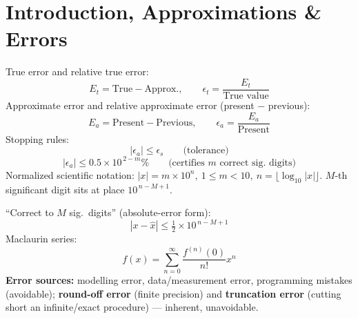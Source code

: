 \section{Introduction, Approximations \& Errors}

\begin{formulabox}
True error and relative true error:
\[
E_t = \text{True} - \text{Approx.}, \qquad \epsilon_t = \frac{E_t}{\text{True value}}
\]
Approximate error and relative approximate error (present $-$ previous):
\[
E_a = \text{Present} - \text{Previous}, \qquad \epsilon_a = \frac{E_a}{\text{Present}}
\]
Stopping rules:
\[
|\epsilon_a| \le \epsilon_s \qquad \text{(tolerance)}
\]
\[
|\epsilon_a| \le 0.5\times10^{\,2-m}\% \qquad \text{(certifies $m$ correct sig.\ digits)}
\]
Normalized scientific notation: $|x|=m\times10^n,\ 1\le m<10,\ n=\lfloor\log_{10}|x|\rfloor$. $M$-th significant digit sits at place $10^{\,n-M+1}$.

``Correct to $M$ sig.\ digits'' (absolute-error form):
\[
|x-\hat x| \le \tfrac12\times10^{\,n-M+1}
\]
Maclaurin series:
\[
f(x) = \sum_{n=0}^{\infty}\frac{f^{(n)}(0)}{n!}x^n
\]
\textbf{Error sources:} modelling error, data/measurement error, programming mistakes (avoidable); \textbf{round-off error} (finite precision) and \textbf{truncation error} (cutting short an infinite/exact procedure) — inherent, unavoidable.
\end{formulabox}
